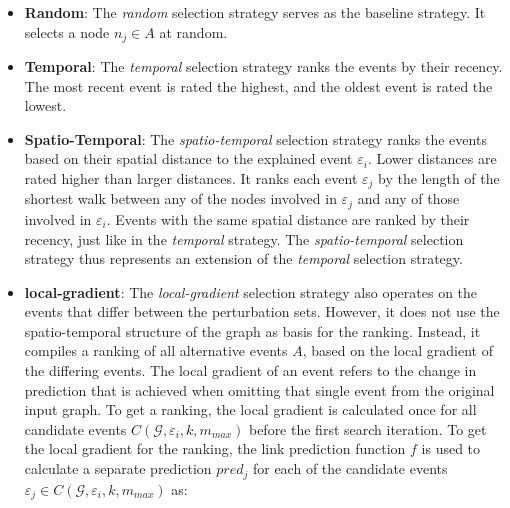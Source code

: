 \begin{itemize}
    \item \textbf{Random}: The \textit{random} selection strategy serves as the baseline strategy. It selects a node $n_j \in A$ at random.
    \item \textbf{Temporal}: The \textit{temporal} selection strategy ranks the events by their recency. The most recent event is rated the highest, and the oldest event is rated the lowest.
    \item \textbf{Spatio-Temporal}: The \textit{spatio-temporal} selection strategy ranks the events based on their spatial distance to the explained event $\varepsilon_i$. Lower distances are rated higher than larger distances. It ranks each event $\varepsilon_j$ by the length of the shortest walk between any of the nodes involved in $\varepsilon_j$ and any of those involved in $\varepsilon_i$. Events with the same spatial distance are ranked by their recency, just like in the \textit{temporal} strategy. The \textit{spatio-temporal} selection strategy thus represents an extension of the \textit{temporal} selection strategy.
    \item \textbf{local-gradient}: The \textit{local-gradient} selection strategy also operates on the events that differ between the perturbation sets. However, it does not use the spatio-temporal structure of the graph as basis for the ranking. Instead, it compiles a ranking of all alternative events $A$, based on the local gradient of the differing events. The local gradient of an event refers to the change in prediction that is achieved when omitting that single event from the original input graph. To get a ranking, the local gradient is calculated once for all candidate events  $C(\mathcal{G}, \varepsilon_i, k, m_{max})$ before the first search iteration. To get the local gradient for the ranking, the link prediction function $f$ is used to calculate a separate prediction $pred_j$ for each of the candidate events $\varepsilon_j \in C(\mathcal{G}, \varepsilon_i, k, m_{max})$ as:

\end{itemize}
